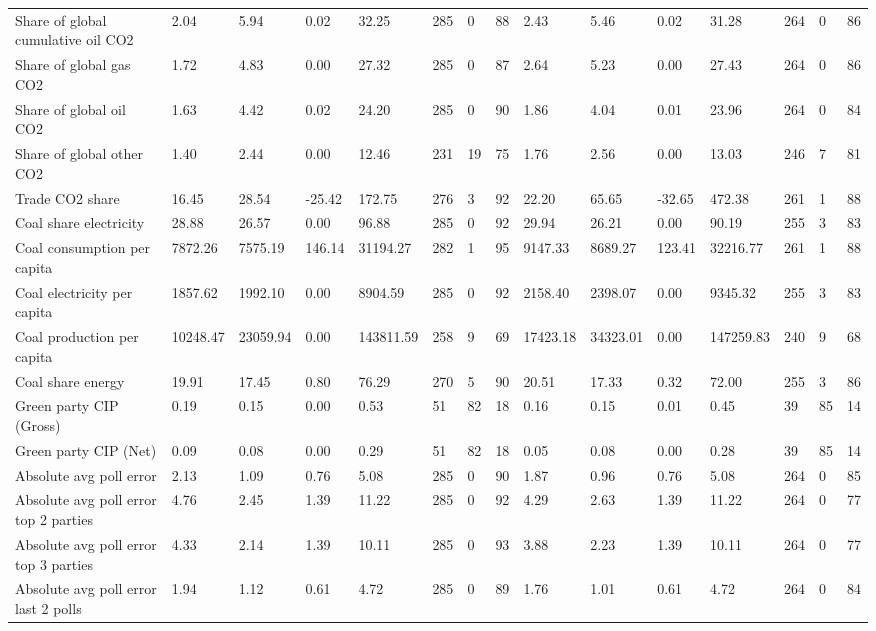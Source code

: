 \begin{longtable}{lllllllllllllll}
Share of global cumulative oil CO2 & 2.04 & 5.94 & 0.02 & 32.25 & 285 & 0 & 88 & 2.43 & 5.46 & 0.02 & 31.28 & 264 & 0 & 86\\
\addlinespace
Share of global gas CO2 & 1.72 & 4.83 & 0.00 & 27.32 & 285 & 0 & 87 & 2.64 & 5.23 & 0.00 & 27.43 & 264 & 0 & 86\\
Share of global oil CO2 & 1.63 & 4.42 & 0.02 & 24.20 & 285 & 0 & 90 & 1.86 & 4.04 & 0.01 & 23.96 & 264 & 0 & 84\\
Share of global other CO2 & 1.40 & 2.44 & 0.00 & 12.46 & 231 & 19 & 75 & 1.76 & 2.56 & 0.00 & 13.03 & 246 & 7 & 81\\
Trade CO2 share & 16.45 & 28.54 & -25.42 & 172.75 & 276 & 3 & 92 & 22.20 & 65.65 & -32.65 & 472.38 & 261 & 1 & 88\\
Coal share electricity & 28.88 & 26.57 & 0.00 & 96.88 & 285 & 0 & 92 & 29.94 & 26.21 & 0.00 & 90.19 & 255 & 3 & 83\\
\addlinespace
Coal consumption per capita & 7872.26 & 7575.19 & 146.14 & 31194.27 & 282 & 1 & 95 & 9147.33 & 8689.27 & 123.41 & 32216.77 & 261 & 1 & 88\\
Coal electricity per capita & 1857.62 & 1992.10 & 0.00 & 8904.59 & 285 & 0 & 92 & 2158.40 & 2398.07 & 0.00 & 9345.32 & 255 & 3 & 83\\
Coal production per capita & 10248.47 & 23059.94 & 0.00 & 143811.59 & 258 & 9 & 69 & 17423.18 & 34323.01 & 0.00 & 147259.83 & 240 & 9 & 68\\
Coal share energy & 19.91 & 17.45 & 0.80 & 76.29 & 270 & 5 & 90 & 20.51 & 17.33 & 0.32 & 72.00 & 255 & 3 & 86\\
Green party CIP (Gross) & 0.19 & 0.15 & 0.00 & 0.53 & 51 & 82 & 18 & 0.16 & 0.15 & 0.01 & 0.45 & 39 & 85 & 14\\
\addlinespace
Green party CIP (Net) & 0.09 & 0.08 & 0.00 & 0.29 & 51 & 82 & 18 & 0.05 & 0.08 & 0.00 & 0.28 & 39 & 85 & 14\\
Absolute avg poll error & 2.13 & 1.09 & 0.76 & 5.08 & 285 & 0 & 90 & 1.87 & 0.96 & 0.76 & 5.08 & 264 & 0 & 85\\
Absolute avg poll error top 2 parties & 4.76 & 2.45 & 1.39 & 11.22 & 285 & 0 & 92 & 4.29 & 2.63 & 1.39 & 11.22 & 264 & 0 & 77\\
Absolute avg poll error top 3 parties & 4.33 & 2.14 & 1.39 & 10.11 & 285 & 0 & 93 & 3.88 & 2.23 & 1.39 & 10.11 & 264 & 0 & 77\\
Absolute avg poll error last 2 polls & 1.94 & 1.12 & 0.61 & 4.72 & 285 & 0 & 89 & 1.76 & 1.01 & 0.61 & 4.72 & 264 & 0 & 84\\

\end{longtable}

